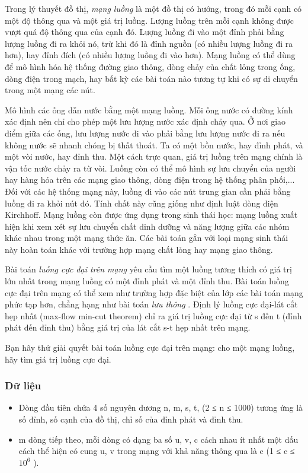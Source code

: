 



   Trong lý thuyết đồ thị,   \emph{    mạng luồng   }   là một đồ thị có hướng, trong đó mỗi cạnh có một độ thông qua và một giá trị luồng. Lượng luồng trên mỗi cạnh không được vượt quá độ thông qua của cạnh đó.   Lượng luồng đi vào một đỉnh phải bằng lượng luồng đi ra khỏi nó, trừ khi đó là đỉnh nguồn (có nhiều lượng luồng đi ra hơn), hay đỉnh đích (có nhiều lượng luồng đi vào hơn). Mạng luồng có thể dùng để mô   hình hóa hệ thống đường giao thông, dòng chảy của chất lỏng trong ống, dòng điện trong mạch, hay bất kỳ các bài toán nào tương tự khi có sự di chuyển trong một mạng các nút.  

   Mô hình các ống dẫn nước bằng một mạng luồng. Mỗi ống nước có đường kính xác định nên chỉ cho phép một lưu lượng nước xác định chảy qua. Ở nơi giao điểm giữa các ống, lưu lượng nước đi vào   phải bằng lưu lượng nước đi ra nếu không nước sẽ nhanh chóng bị thất thoát. Ta có một bồn nước, hay đỉnh phát, và một vòi nước, hay đỉnh thu. Một cách trực quan, giá trị luồng trên mạng chính là vận tốc   nước chảy ra từ vòi. Luồng còn có thể mô hình sự lưu chuyển của người hay hàng hóa trên các mạng giao thông, dòng điện trong hệ thống phân phối,... Đối với các hệ thống mạng này, luồng đi vào các nút   trung gian cần phải bằng luồng đi ra khỏi nút đó. Tính chất này cũng giống như định luật dòng điện Kirchhoff. Mạng luồng còn được ứng dụng trong sinh thái học: mạng luồng xuất hiện khi xem xét sự lưu   chuyển chất dinh dưỡng và năng lượng giữa các nhóm khác nhau trong một mạng thức ăn. Các bài toán gắn với loại mạng sinh thái này hoàn toán khác với trường hợp mạng chất lỏng hay mạng giao thông.  

   Bài toán   \emph{    luồng cực đại trên mạng   }   yêu cầu tìm một luồng tương thích có giá trị lớn nhất trong mạng luồng có một đỉnh phát và một đỉnh thu. Bài toán luồng cực đại trên mạng có thể xem như trường   hợp đặc biệt của lớp các bài toán mạng phức tạp hơn, chẳng hạng như bài toán   \emph{    lưu thông   }   . Định lý luồng cực đại-lát cắt hẹp nhất (max-flow min-cut theorem) chỉ ra giá trị luồng cực đại từ s đến t (đỉnh   phát đến đỉnh thu) bằng giá trị của lát cắt s-t hẹp nhất trên mạng.  

   Bạn hãy thử giải quyết bài toán luồng cực đại trên mạng: cho một mạng luồng, hãy tìm giá trị luồng cực đại.  

\subsubsection{   Dữ liệu  }
\begin{itemize}
	\item     Dòng đầu tiên chứa 4 số nguyên dương n, m, s, t, (2 ≤ n ≤ 1000) tương ứng là số đỉnh, số cạnh của đồ thị, chỉ số của đỉnh phát và đỉnh thu.   
	\item     m dòng tiếp theo, mỗi dòng có dạng ba số u, v, c cách nhau ít nhất một dấu cách thể hiện có cung u, v trong mạng với khả năng thông qua là c (1 ≤ c ≤ $10^{6}$    ).   
\end{itemize}

